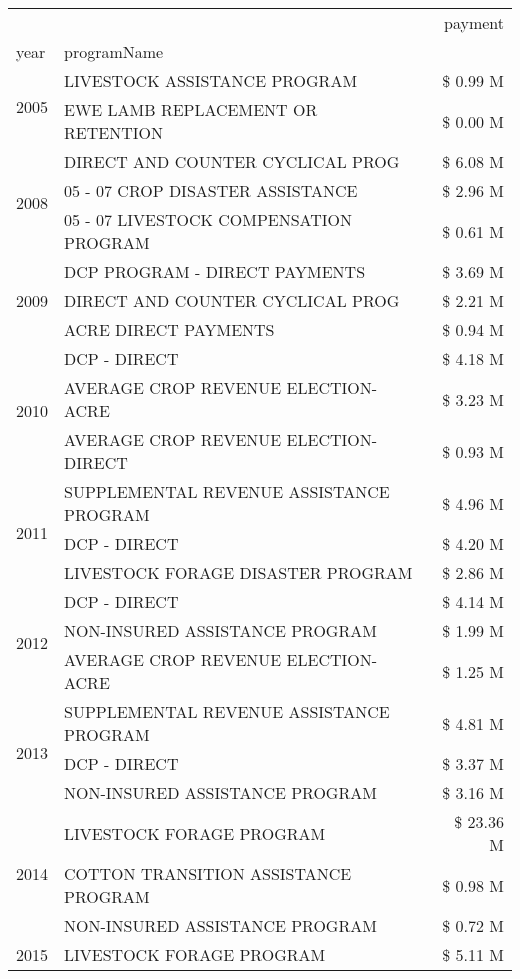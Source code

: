 \begin{tabular}{llr}
\toprule
 &  & payment \\
year & programName &  \\
\midrule
\multirow[t]{2}{*}{2005} & LIVESTOCK ASSISTANCE PROGRAM & \$ 0.99 M \\
 & EWE LAMB REPLACEMENT OR RETENTION & \$ 0.00 M \\
\cline{1-3}
\multirow[t]{3}{*}{2008} & DIRECT AND COUNTER CYCLICAL PROG & \$ 6.08 M \\
 & 05 - 07 CROP DISASTER ASSISTANCE & \$ 2.96 M \\
 & 05 - 07 LIVESTOCK COMPENSATION PROGRAM & \$ 0.61 M \\
\cline{1-3}
\multirow[t]{3}{*}{2009} & DCP PROGRAM - DIRECT PAYMENTS & \$ 3.69 M \\
 & DIRECT AND COUNTER CYCLICAL PROG & \$ 2.21 M \\
 & ACRE DIRECT PAYMENTS & \$ 0.94 M \\
\cline{1-3}
\multirow[t]{3}{*}{2010} & DCP - DIRECT & \$ 4.18 M \\
 & AVERAGE CROP REVENUE ELECTION-ACRE & \$ 3.23 M \\
 & AVERAGE CROP REVENUE ELECTION-DIRECT & \$ 0.93 M \\
\cline{1-3}
\multirow[t]{3}{*}{2011} & SUPPLEMENTAL REVENUE ASSISTANCE PROGRAM & \$ 4.96 M \\
 & DCP - DIRECT & \$ 4.20 M \\
 & LIVESTOCK FORAGE DISASTER PROGRAM & \$ 2.86 M \\
\cline{1-3}
\multirow[t]{3}{*}{2012} & DCP - DIRECT & \$ 4.14 M \\
 & NON-INSURED ASSISTANCE PROGRAM & \$ 1.99 M \\
 & AVERAGE CROP REVENUE ELECTION-ACRE & \$ 1.25 M \\
\cline{1-3}
\multirow[t]{3}{*}{2013} & SUPPLEMENTAL REVENUE ASSISTANCE PROGRAM & \$ 4.81 M \\
 & DCP - DIRECT & \$ 3.37 M \\
 & NON-INSURED ASSISTANCE PROGRAM & \$ 3.16 M \\
\cline{1-3}
\multirow[t]{3}{*}{2014} & LIVESTOCK FORAGE PROGRAM & \$ 23.36 M \\
 & COTTON TRANSITION ASSISTANCE PROGRAM & \$ 0.98 M \\
 & NON-INSURED ASSISTANCE PROGRAM & \$ 0.72 M \\
\cline{1-3}
\multirow[t]{3}{*}{2015} & LIVESTOCK FORAGE PROGRAM & \$ 5.11 M \\

\end{tabular}
